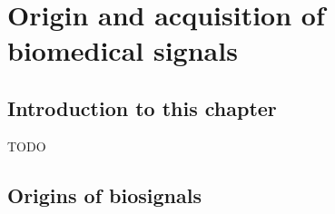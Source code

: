 





\glsresetall

\chapter{Origin and acquisition of biomedical signals}
\label{ch:biomedical_signals}

\section{Introduction to this chapter}
\label{sec:biomedical_signals_introduction}


TODO


\section{Origins of biosignals}
\label{sec:biomedical_signals_origin}


